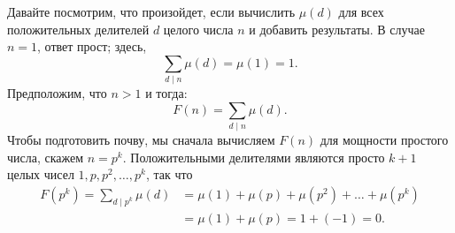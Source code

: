 \documentclass[11pt]{article}
\begin{document}
	Давайте посмотрим, что произойдет, если вычислить $\mu(d)$ для всех положительных делителей $d$ целого числа $n$ и добавить результаты. В случае $n = 1$, ответ прост; здесь, \[\sum \limits_{d\mid n}\mu(d)=\mu(1)=1.\]
	Предположим, что $n > 1$ и тогда: \[F(n)=\sum \limits_{d\mid n}\mu(d).\] 
	Чтобы подготовить почву, мы сначала вычисляем $F(n)$ для мощности простого числа, скажем $n=p^{k}$. Положительными делителями являются просто $k + 1$ целых чисел $1,p,p^{2},\ldots,p^{k}$, так что
	\begin{align*}
	F(p^{k})=\sum \limits_{d\mid p^{k}}\mu(d)&=\mu(1)+\mu(p)+\mu(p^{2})+\ldots+\mu(p^{k})\\
	&= \mu(1)+\mu(p)=1+(-1)=0.
	\end{align*}	
\end{document}
